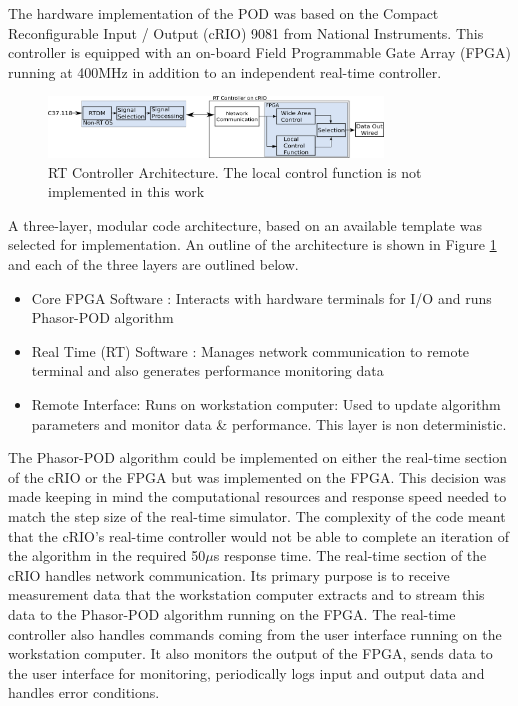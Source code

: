 \documentclass[journal]{IEEEtran}
\begin{document}
The hardware implementation of the POD was based on the Compact Reconfigurable Input / Output (cRIO) 9081 \cite{cRIO9081} from National Instruments. This controller is equipped with an on-board Field Programmable Gate Array (FPGA) running at 400MHz in addition to an independent real-time controller. \\
\begin{figure}[!t]
\centering
\includegraphics[width=3.5in]{Final_RT_Arch.png} 
\caption{RT Controller Architecture. The local control function is not implemented in this work} %
\label{RTArchitecture}
\end{figure}

A three-layer, modular code architecture, based on an available template \cite{LabviewTemplate} was selected for implementation. An outline of the architecture is shown in Figure \ref{RTArchitecture} and each of the three layers are outlined below. 

\begin{itemize}
\item Core FPGA Software : Interacts with hardware terminals for I/O and runs Phasor-POD algorithm

\item Real Time (RT) Software : Manages network communication to remote terminal and also generates performance monitoring data

\item Remote Interface: Runs on workstation computer: Used to update algorithm parameters and monitor data \& performance. This layer is non deterministic.
\end{itemize}

The Phasor-POD algorithm could be implemented on either the real-time section of the cRIO or the FPGA but was implemented on the FPGA. This decision was made keeping in mind the computational resources and response speed needed to match the step size of the real-time simulator. The complexity of the code meant that the cRIO\rq{s} real-time controller would not be able to complete an iteration of the algorithm in the required 50$\mu$s response time. The real-time section of the cRIO handles network communication. Its primary purpose is to receive measurement data that the workstation computer extracts and to stream this data to the Phasor-POD algorithm running on the FPGA. The real-time controller also handles commands coming from the user interface running on the workstation computer.  It also monitors the output of the FPGA, sends data to the user interface for monitoring, periodically logs input and output data and handles error  conditions.\\
\end{document}
